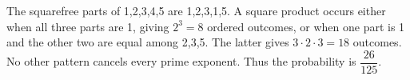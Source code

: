 The squarefree parts of 1,2,3,4,5 are 1,2,3,1,5. A square product occurs either when all three parts are 1, giving $ 2^3=8 $ ordered outcomes, or when one part is 1 and the other two are equal among 2,3,5. The latter gives $ 3\cdot2\cdot3=18 $ outcomes. No other pattern cancels every prime exponent. Thus the probability is $\boxed{\dfrac{26}{125}}$.
